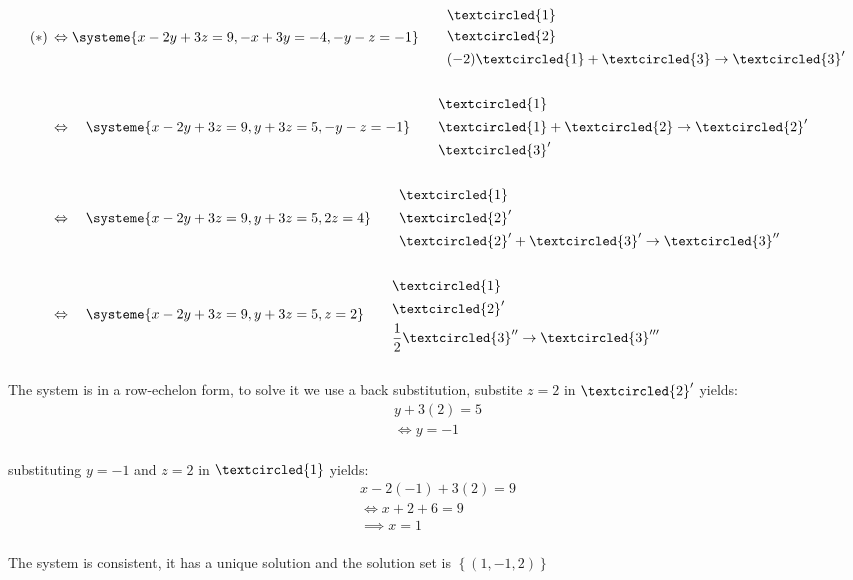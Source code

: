 \documentclass{jhwhw}
\begin{document}
\begin{align*} 
(\ast) \, &\Leftrightarrow \systeme{x-2y+3z=9, -x+3y=-4, -y-z=-1} \quad \quad \begin{aligned} &\textcircled{1} \\ &\textcircled{2} \\ &(-2)\textcircled{1}+\textcircled{3} \rightarrow \textcircled{3}'\end{aligned}
\\ \\
&\Leftrightarrow \quad \systeme{x-2y+3z=9, y+3z=5, -y-z=-1} \quad \quad \begin{aligned} &\textcircled{1} \\ &\textcircled{1}+\textcircled{2} \rightarrow \textcircled{2}' \\ &\textcircled{3}'\end{aligned}
\\ \\
&\Leftrightarrow \quad \systeme{x-2y+3z=9, y+3z=5, 2z=4} \quad \quad \begin{aligned} &\textcircled{1} \\ &\textcircled{2}' \\ &\textcircled{2}'+\textcircled{3}' \rightarrow \textcircled{3}''\end{aligned}
\\ \\
&\Leftrightarrow \quad \systeme{x-2y+3z=9, y+3z=5, z=2} \quad \quad \begin{aligned} &\textcircled{1} \\ &\textcircled{2}' \\ &\frac{1}{2}\textcircled{3}'' \rightarrow \textcircled{3}'''\end{aligned}
\end{align*}
\\

The system is in a row-echelon form, to solve it we use a back substitution, substite \(\boxed{z=2}\) in \(\textcircled{2}'\) yields:
\\

\begin{align*} 
y+3(2)=5\\
\Leftrightarrow \boxed{y=-1}
\end{align*}
\\

substituting \(y=-1\) and \(z=2\) in \(\textcircled{1}\) yields:
\\

\begin{align*} 
x-2(-1)+3(2)=9\\
\Leftrightarrow x+2+6=9\\
\implies \boxed{x=1}
\end{align*}
\\
The system is consistent, it has a unique solution and the solution set is \(\left\{(1,-1,2)\right\}\)
\\ \\
\end{document}
